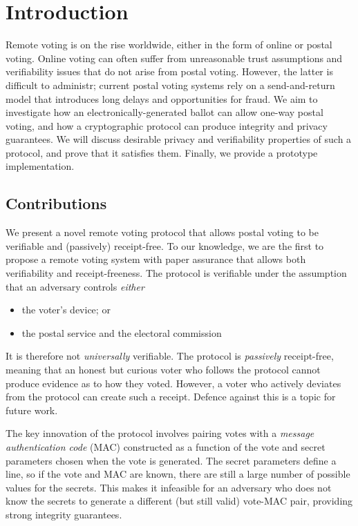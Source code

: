\documentclass[12pt,a4paper]{article}
\theoremstyle{definition}
\begin{document}
\section{Introduction}
Remote voting is on the rise worldwide, either in the form of online or postal voting. Online voting can often suffer from unreasonable trust assumptions and verifiability issues that do not arise from postal voting. However, the latter is difficult to administr; current postal voting systems rely on a send-and-return model that introduces long delays and opportunities for fraud. We aim to investigate how an electronically-generated ballot can allow one-way postal voting, and how a cryptographic protocol can produce integrity and privacy guarantees. We will discuss desirable privacy and verifiability properties of such a protocol, and prove that it satisfies them. Finally, we provide a prototype implementation.

\subsection{Contributions}
We present a novel remote voting protocol that allows postal voting to be verifiable and (passively) receipt-free. To our knowledge, we are the first to propose a remote voting system with paper assurance that allows both verifiability and receipt-freeness. The protocol is verifiable under the assumption that an adversary controls \textit{either}
\begin{itemize}
    \item the voter's device; or
    \item the postal service and the electoral commission
\end{itemize}
It is therefore not \textit{universally} verifiable. The protocol is \textit{passively} receipt-free, meaning that an honest but curious voter who follows the protocol cannot produce evidence as to how they voted. However, a voter who actively deviates from the protocol can create such a receipt. Defence against this is a topic for future work.

The key innovation of the protocol involves pairing votes with a \textit{message authentication code} (MAC) constructed as a function of the vote and secret parameters chosen when the vote is generated. The secret parameters define a line, so if the vote and MAC are known, there are still a large number of possible values for the secrets. This makes it infeasible for an adversary who does not know the secrets to generate a different (but still valid) vote-MAC pair, providing strong integrity guarantees.
\end{document}
